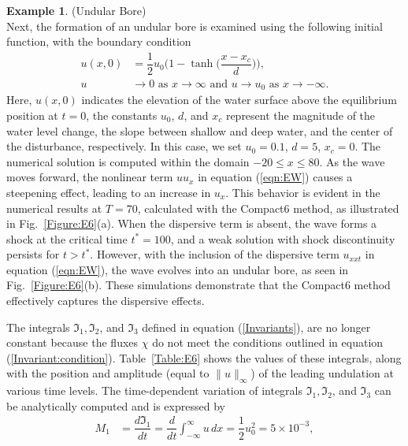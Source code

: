 \documentclass[11pt,a4paper]{amsart}
\theoremstyle{plain}
\theoremstyle{definition}
\newtheorem{example}[theorem]{Example}
\theoremstyle{remark}
\numberwithin{equation}{section}
\begin{document}
\begin{example}
\normalfont
(Undular Bore) \\
Next, the formation of an undular bore is examined using the following initial function, with the boundary condition 
\begin{align}\label{example:5}
    u(x,0) &= \dfrac{1}{2} u_0 \biggl(1 - \tanh \biggl(\dfrac{x - x_c}{d}\biggr)\biggr), \\
    u &\to 0 \text{ as } x \to \infty \text{ and } u \to u_0 \text{ as } x \to -\infty.
\end{align}
Here, $u(x,0)$ indicates the elevation of the water surface above the equilibrium position at $t=0$, the constants $u_0$, $d$, and $x_c$  represent the magnitude of the water level change, the slope between shallow and deep water, and the center of the disturbance, respectively. In this case, we set $u_0=0.1$, $d = 5$, $x_c=0$. The numerical solution is computed within the domain $-20 \leq x \leq 80$. As the wave moves forward, the nonlinear term $ u u_x $ in equation (\ref{eqn:EW}) causes a steepening effect, leading to an increase in $ u_x $. This behavior is evident in the numerical results at $ T = 70 $, calculated with the Compact6 method, as illustrated in Fig.~\ref{Figure:E6}(a). When the dispersive term is absent, the wave forms a shock at the critical time $ t^* = 100 $, and a weak solution with shock discontinuity persists for $ t > t^* $. However, with the inclusion of the dispersive term $ u_{xxt} $ in equation (\ref{eqn:EW}), the wave evolves into an undular bore, as seen in Fig.~\ref{Figure:E6}(b). These simulations demonstrate that the Compact6 method effectively captures the dispersive effects.
\par
The integrals $\mathfrak{I}_1, \mathfrak{I}_2$, and $\mathfrak{I}_3$ defined in equation (\ref{Invariants}), are no longer constant because the fluxes $\chi$ do not meet the conditions outlined in equation (\ref{Invariant:condition}). Table~\ref{Table:E6} shows the values of these integrals, along with the position and amplitude (equal to $\|u\|_\infty$) of the leading undulation at various time levels. The time-dependent variation of integrals $\mathfrak{I}_1, \mathfrak{I}_2$, and $\mathfrak{I}_3$ can be analytically computed and is expressed by
\begin{equation}
    \begin{split}
        M_1 &= \dfrac{d\mathfrak{I}_1}{dt} = \dfrac{d}{dt} \int_{-\infty}^{\infty} u \, dx = \dfrac{1}{2} u_0^2 = 5 \times 10^{-3},\\

\end{split}
\end{equation}
\end{example}
\end{document}
